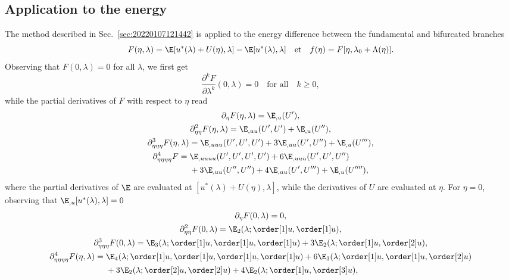 \subsection{Application to the energy}
\label{sec:20220525053434}
%

The method described in Sec.~\ref{sec:20220107121442} is applied to the energy difference between the fundamental and
bifurcated branches
\begin{equation}
  F(\eta, \lambda) = \E[u^{\ast}(\lambda) + U(\eta), \lambda] - \E[u^{\ast}(\lambda), \lambda]
  \quad \text{et} \quad
  f(\eta) = F [\eta, \lambda_0 + \Lambda(\eta)].
\end{equation}
Observing that $F(0, \lambda) = 0$ for all $\lambda$, we first get
\begin{equation*}
  \frac{\partial^k F}{\partial \lambda^k}(0, \lambda) = 0 \quad \text{for all} \quad k \geq 0,
\end{equation*}
while the partial derivatives of $F$ with respect to $\eta$ read
\begin{gather*}
  \partial_{\eta} F(\eta, \lambda) = \E_{, u}(U'),\\
  \partial_{\eta\eta}^2 F(\eta, \lambda) = \E_{, uu} (U', U') + \E_{, u} (U''),\\
  \partial_{\eta\eta\eta}^3 F(\eta, \lambda) = \E_{, uuu}(U', U', U') + 3\E_{, uu}(U', U'') + \E_{, u}(U'''),\\
  \begin{aligned}[b]
    \partial_{\eta\eta\eta\eta}^4 F ={}
    & \E_{, uuuu}(U', U', U', U') + 6\E_{,uuu}(U', U', U'')\\
    & + 3\E_{, uu}(U'', U'') + 4\E_{, uu}(U', U''') + \E_{, u}(U''''),
  \end{aligned}
\end{gather*}
where the partial derivatives of $\E$ are evaluated at $[u^{\ast}(\lambda) + U(\eta), \lambda]$, while the derivatives
of $U$ are evaluated at $\eta$. For $\eta = 0$, observing that $\E_{, u}[u^{\ast}(\lambda), \lambda] = 0$
\begin{gather*}
  \partial_{\eta} F(0, \lambda) = 0,\\
  \partial_{\eta\eta}^2 F(0, \lambda) =\E_2(\lambda ; \order[1]u, \order[1]u),\\
  \partial_{\eta\eta\eta}^3 F(0, \lambda) = \E_3(\lambda; \order[1]u, \order[1]u, \order[1]u) + 3\E_2(\lambda; \order[1]u, \order[2]u),\\
  \begin{aligned}[b]
    \partial_{\eta\eta\eta\eta}^4 F(\eta, \lambda) ={} & \E_4(\lambda; \order[1]u, \order[1]u, \order[1]u, \order[1]u) + 6\E_3(\lambda; \order[1]u, \order[1]u, \order[2]u)\\
    & + 3\E_2(\lambda; \order[2]u, \order[2]u) + 4\E_2(\lambda; \order[1]u, \order[3]u),
  \end{aligned}
\end{gather*}
